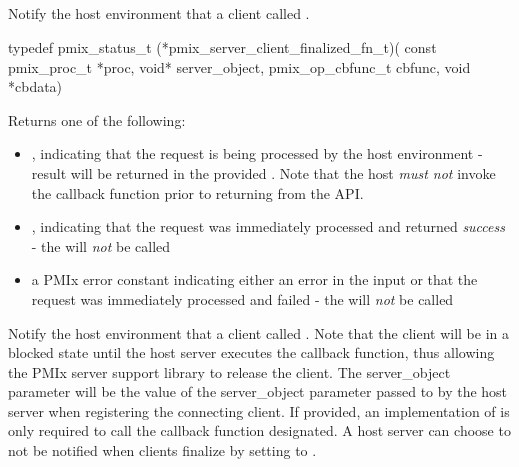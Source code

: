 \subsection{}

\summary

Notify the host environment that a client called .

\format

\cspecificstart
\begin{codepar}
typedef pmix_status_t (*pmix_server_client_finalized_fn_t)(
                             const pmix_proc_t *proc,
                             void* server_object,
                             pmix_op_cbfunc_t cbfunc,
                             void *cbdata)
\end{codepar}
\cspecificend

\begin{arglist}
\end{arglist}

Returns one of the following:

\begin{itemize}
    \item {}, indicating that the request is being processed by the host environment - result will be returned in the provided . Note that the host \emph{must not} invoke the callback function prior to returning from the \ac{API}.
    \item {}, indicating that the request was immediately processed and returned \textit{success} - the  will \textit{not} be called
    \item a PMIx error constant indicating either an error in the input or that the request was immediately processed and failed - the  will \textit{not} be called
\end{itemize}

\descr

Notify the host environment that a client called .
Note that the client will be in a blocked state until the host server executes the callback function, thus allowing the PMIx server support library to release the client.
The server_object parameter will be the value of the server_object parameter passed to
 by the host server when registering the connecting client.  If provided, an implementation of 
is only required to
call the callback function designated.  A host server can choose to not be notified when clients finalize by setting  to .

